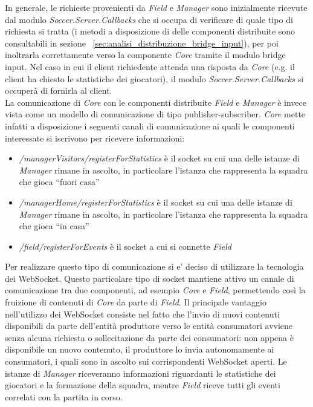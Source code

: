In generale, le richieste provenienti da \emph{Field} e \emph{Manager} sono inizialmente ricevute dal modulo \emph{Soccer.Server.Callbacks} che si occupa di verificare di quale tipo di richiesta si tratta (i metodi a disposizione di delle componenti distribuite sono consultabili in sezione ~\ref{sec:analisi_distribuzione_bridge_input}), per poi inoltrarla correttamente verso la componente \emph{Core} tramite il modulo bridge input. Nel caso in cui il client richiedente attenda una risposta da \emph{Core} (e.g. il client ha chiesto le statistiche dei giocatori), il modulo \emph{Soccer.Server.Callbacks} si occuper\`{a} di fornirla al client.\\

La comunicazione di \emph{Core} con le componenti distribuite \emph{Field} e \emph{Manager} \`{e} invece vista come un modello di comunicazione di tipo publisher-subscriber. \emph{Core} mette infatti a disposizione i seguenti canali di comunicazione ai quali le componenti interessate si iscrivono per ricevere informazioni:

\begin{itemize}
	\item \emph{/managerVisitors/registerForStatistics} \`{e} il socket su cui una delle istanze di \emph{Manager} rimane in ascolto, in particolare l'istanza che rappresenta la squadra che gioca ``fuori casa''
	\item \emph{/managerHome/registerForStatistics} \`{e} il socket su cui una delle istanze di \emph{Manager} rimane in ascolto, in particolare l'istanza che rappresenta la squadra che gioca ``in casa''
	\item \emph{/field/registerForEvents} \`{e} il socket a cui si connette \emph{Field}
\end{itemize}

\noindent Per realizzare questo tipo di comunicazione si e' deciso di utilizzare la tecnologia dei WebSocket. Questo particolare tipo di socket mantiene attivo un canale di comunicazione tra due componenti, ad esempio \emph{Core} e \emph{Field}, permettendo cos\`{i} la fruizione di contenuti di \emph{Core} da parte di \emph{Field}. Il principale vantaggio nell'utilizzo dei WebSocket consiste nel fatto che l'invio di nuovi contenuti disponibili da parte dell'entit\`{a} produttore verso le entit\`{a} consumatori avviene senza alcuna richiesta o sollecitazione da parte dei consumatori: non appena \`{e} disponibile un nuovo contenuto, il produttore lo invia autonomamente ai consumatori, i quali sono in ascolto sui corrispondenti WebSocket aperti. Le istanze di \emph{Manager} riceveranno informazioni riguardanti le statistiche dei giocatori e la formazione della squadra, mentre \emph{Field} riceve tutti gli eventi correlati con la partita in corso.\\

